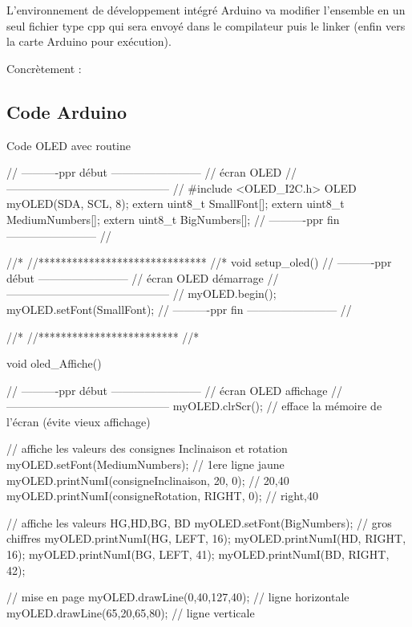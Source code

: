 L'environnement de développement intégré  Arduino va modifier l'ensemble en 
un seul fichier type cpp qui sera envoyé dans le compilateur puis le linker 
(enfin vers la carte Arduino pour exécution).

Concrètement : 


\subsection{Code Arduino}

\begin{Cpp}{Code OLED avec routine}

    // ----------ppr début ------------------------
// écran OLED
// --------------------------------------------
//
#include <OLED_I2C.h>
OLED  myOLED(SDA, SCL, 8);
extern uint8_t SmallFont[];
extern uint8_t MediumNumbers[];
extern uint8_t BigNumbers[];
// ----------ppr fin   ------------------------
//

//*
//******************************
//*
void setup_oled() { 
  // ----------ppr début ------------------------
  // écran OLED démarrage
  // --------------------------------------------
  //
  myOLED.begin();
  myOLED.setFont(SmallFont);
  // ----------ppr fin   ------------------------
  //
 }  
  
 //*
 //*************************
 //*
  
 void oled_Affiche() {
  // ----------ppr début ------------------------
  // écran OLED affichage
  // --------------------------------------------
    myOLED.clrScr();   // efface la mémoire de l'écran (évite vieux affichage)

    // affiche les valeurs des consignes Inclinaison et rotation
    myOLED.setFont(MediumNumbers);   // 1ere ligne jaune
    myOLED.printNumI(consigneInclinaison, 20, 0);   // 20,40
    myOLED.printNumI(consigneRotation, RIGHT, 0);   // right,40

    // affiche les valeurs HG,HD,BG, BD 
    myOLED.setFont(BigNumbers);  // gros chiffres
    myOLED.printNumI(HG, LEFT, 16);
    myOLED.printNumI(HD, RIGHT, 16);
    myOLED.printNumI(BG, LEFT, 41);
    myOLED.printNumI(BD, RIGHT, 42);
    
    // mise en page 
    myOLED.drawLine(0,40,127,40);  // ligne horizontale 
    myOLED.drawLine(65,20,65,80);   // ligne verticale   
    
}
\end{Cpp}
